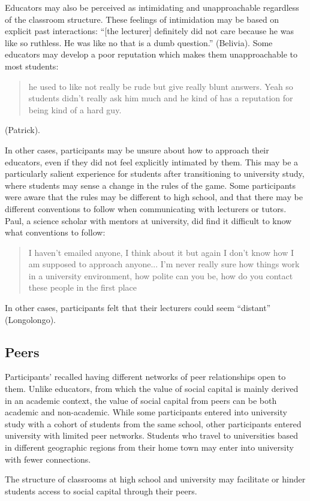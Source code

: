 Educators may also be perceived as intimidating and unapproachable regardless of the classroom structure. These feelings of intimidation may be based on explicit past interactions: ``[the lecturer] definitely did not care because he was like so ruthless. He was like no that is a dumb question.'' (Belivia). Some educators may develop a poor reputation which makes them unapproachable to most students: \blockquote{he used to like not really be rude but give really blunt answers. Yeah so students didn't really ask him much and he kind of has a reputation for being kind of a hard guy.} (Patrick).

In other cases, participants may be unsure about how to approach their educators, even if they did not feel explicitly intimated by them. This may be a particularly salient experience for students after transitioning to university study, where students may sense a change in the rules of the game. Some participants were aware that the rules may be different to high school, and that there may be different conventions to follow when communicating with lecturers or tutors. Paul, a science scholar with mentors at university, did find it difficult to know what conventions to follow:
\blockquote{I haven't emailed anyone, I think about it but again I don't know how I am supposed to approach anyone... I'm never really sure how things work in a university environment, how polite can you be, how do you contact these people in the first place}. In other cases, participants felt that their lecturers could seem ``distant'' (Longolongo).  




\subsection{Peers}
Participants' recalled having different networks of peer relationships open to them. Unlike educators, from which the value of social capital is mainly derived in an academic context, the value of social capital from peers can be both academic and non-academic. While some participants entered into university study with a cohort of students from the same school, other participants entered university with limited peer networks. Students who travel to universities based in different geographic regions from their home town may enter into university with fewer connections. 

The structure of classrooms at high school and university may facilitate or hinder students access to social capital through their peers. 


